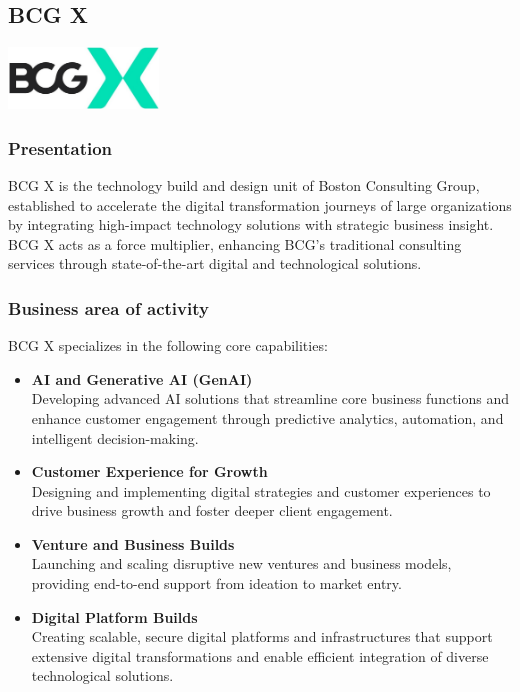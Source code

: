 \subsection{BCG X}
\begin{center}
    \centering
    \includegraphics[width=0.3\textwidth]{Images/BCG_X.jpg}
     \cite{bcg-x}
    \label{fig:labs}
\end{center}

\subsubsection{Presentation}
BCG X is the technology build and design unit of Boston Consulting Group, established to accelerate the digital transformation journeys of large organizations by integrating high-impact technology solutions with strategic business insight. BCG X acts as a force multiplier, enhancing BCG’s traditional consulting services through state-of-the-art digital and technological solutions.

\subsubsection{Business area of activity}
BCG X specializes in the following core capabilities:
\begin{itemize}
    \item \textbf{AI and Generative AI (GenAI) }\\
        Developing advanced AI solutions that streamline core business functions and enhance customer engagement through predictive analytics, automation, and intelligent decision-making.
    \item \textbf{Customer Experience for Growth }\\
        Designing and implementing digital strategies and customer experiences to drive business growth and foster deeper client engagement.
    \item \textbf{Venture and Business Builds }\\
        Launching and scaling disruptive new ventures and business models, providing end-to-end support from ideation to market entry.
    \item \textbf{Digital Platform Builds }\\
        Creating scalable, secure digital platforms and infrastructures that support extensive digital transformations and enable efficient integration of diverse technological solutions.
\end{itemize}


